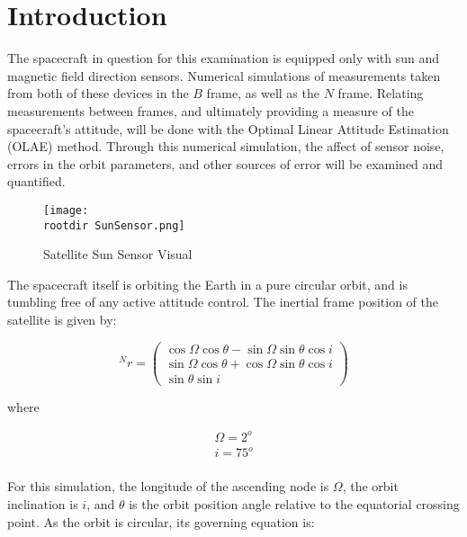 \documentclass[11pt]{aiaa-tc}%
\newcommand{\parens} [1] {\left(  #1  \right)}
\newcommand{\rootdir}{./Figures/}
\newcommand{\arrayp}[2]{\parens{ \begin{array}{#1}  #2 \end{array} } }
\begin{document}
\section{Introduction}
\label{sec:Intro}

The spacecraft in question for this examination is equipped only with sun and magnetic field direction sensors. Numerical simulations of measurements taken from both of these devices in the $B$ frame, as well as the $N$ frame. Relating measurements between frames, and ultimately providing a measure of the spacecraft's attitude, will be done with the Optimal Linear Attitude Estimation (OLAE) method. Through this numerical simulation, the affect of sensor noise, errors in the orbit parameters, and other sources of error will be examined and quantified. 

\begin{centering}
	\begin{figure}[Hh]
	\hspace{2.5cm}
		\texttt{[image: \\rootdir SunSensor.png]}
		\caption{Satellite Sun Sensor Visual}
		\label{fig: Satellite Sun Sensor}
	\end{figure}
\end{centering}


The spacecraft itself is orbiting the Earth in a pure circular orbit, and is tumbling free of any active attitude control. The inertial frame position of the satellite is given by:

\begin{equation}
	^Nr = \arrayp{c}{     \cos{\Omega} \cos{\theta} - \sin{\Omega} \sin{\theta} \cos{i} 	\\
				      \sin{\Omega} \cos{\theta} + \cos{\Omega} \sin{\theta} \cos{i} \\
									\sin{\theta}\sin{i}}
	\label{eq:Inertial Orbit Position Equations}
\end{equation}  

where 

\begin{displaymath}
	\begin{array}{c}
		\Omega=2^o \\
		i = 75^o	\\
	\end{array}
\end{displaymath}

For this simulation, the longitude of the ascending node is $\Omega$, the orbit inclination is $i$, and $\theta$ is the orbit position angle relative to the equatorial crossing point. As the orbit is circular, its governing equation is:
\end{document}
